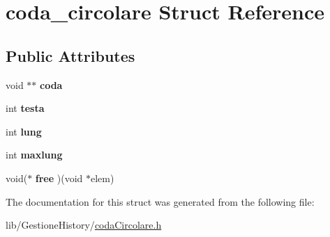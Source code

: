 \hypertarget{structcoda__circolare}{}\section{coda\+\_\+circolare Struct Reference}
\label{structcoda__circolare}
\subsection*{Public Attributes}
\begin{DoxyCompactItemize}
\item 
\mbox{\label{structcoda__circolare_aa81db96f014bb3ae692c57c29de43e1b}} 
void $\ast$$\ast$ {\bfseries coda}
\item 
\mbox{\label{structcoda__circolare_ac0ab8871b566b8b0f65579b8cf181cb4}} 
int {\bfseries testa}
\item 
\mbox{\label{structcoda__circolare_a082293865951415573e496707369d14c}} 
int {\bfseries lung}
\item 
\mbox{\label{structcoda__circolare_ab6e83ba24d75118ea3c63b70d5216f68}} 
int {\bfseries maxlung}
\item 
\mbox{\label{structcoda__circolare_a0c04371b90584a16e2f40315bcae7227}} 
void($\ast$ {\bfseries free} )(void $\ast$elem)
\end{DoxyCompactItemize}


The documentation for this struct was generated from the following file\+:\begin{DoxyCompactItemize}
\item 
lib/\+Gestione\+History/\hyperlink{codaCircolare_8h}{coda\+Circolare.\+h}\end{DoxyCompactItemize}
